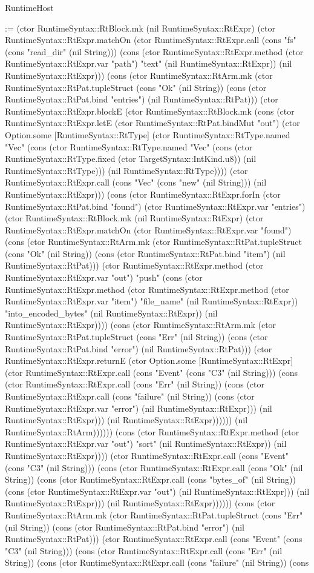 \begin{lexlean}{RuntimeHost}
\begin{semanticmodule}
{:= (ctor RuntimeSyntax::RtBlock.mk (nil RuntimeSyntax::RtExpr) (ctor RuntimeSyntax::RtExpr.matchOn (ctor RuntimeSyntax::RtExpr.call (cons "fs" (cons "read_dir" (nil String))) (cons (ctor RuntimeSyntax::RtExpr.method (ctor RuntimeSyntax::RtExpr.var "path") "text" (nil RuntimeSyntax::RtExpr)) (nil RuntimeSyntax::RtExpr))) (cons (ctor RuntimeSyntax::RtArm.mk (ctor RuntimeSyntax::RtPat.tupleStruct (cons "Ok" (nil String)) (cons (ctor RuntimeSyntax::RtPat.bind "entries") (nil RuntimeSyntax::RtPat))) (ctor RuntimeSyntax::RtExpr.blockE (ctor RuntimeSyntax::RtBlock.mk (cons (ctor RuntimeSyntax::RtExpr.letE (ctor RuntimeSyntax::RtPat.bindMut "out") (ctor Option.some [RuntimeSyntax::RtType] (ctor RuntimeSyntax::RtType.named "Vec" (cons (ctor RuntimeSyntax::RtType.named "Vec" (cons (ctor RuntimeSyntax::RtType.fixed (ctor TargetSyntax::IntKind.u8)) (nil RuntimeSyntax::RtType))) (nil RuntimeSyntax::RtType)))) (ctor RuntimeSyntax::RtExpr.call (cons "Vec" (cons "new" (nil String))) (nil RuntimeSyntax::RtExpr))) (cons (ctor RuntimeSyntax::RtExpr.forIn (ctor RuntimeSyntax::RtPat.bind "found") (ctor RuntimeSyntax::RtExpr.var "entries") (ctor RuntimeSyntax::RtBlock.mk (nil RuntimeSyntax::RtExpr) (ctor RuntimeSyntax::RtExpr.matchOn (ctor RuntimeSyntax::RtExpr.var "found") (cons (ctor RuntimeSyntax::RtArm.mk (ctor RuntimeSyntax::RtPat.tupleStruct (cons "Ok" (nil String)) (cons (ctor RuntimeSyntax::RtPat.bind "item") (nil RuntimeSyntax::RtPat))) (ctor RuntimeSyntax::RtExpr.method (ctor RuntimeSyntax::RtExpr.var "out") "push" (cons (ctor RuntimeSyntax::RtExpr.method (ctor RuntimeSyntax::RtExpr.method (ctor RuntimeSyntax::RtExpr.var "item") "file_name" (nil RuntimeSyntax::RtExpr)) "into_encoded_bytes" (nil RuntimeSyntax::RtExpr)) (nil RuntimeSyntax::RtExpr)))) (cons (ctor RuntimeSyntax::RtArm.mk (ctor RuntimeSyntax::RtPat.tupleStruct (cons "Err" (nil String)) (cons (ctor RuntimeSyntax::RtPat.bind "error") (nil RuntimeSyntax::RtPat))) (ctor RuntimeSyntax::RtExpr.returnE (ctor Option.some [RuntimeSyntax::RtExpr] (ctor RuntimeSyntax::RtExpr.call (cons "Event" (cons "C3" (nil String))) (cons (ctor RuntimeSyntax::RtExpr.call (cons "Err" (nil String)) (cons (ctor RuntimeSyntax::RtExpr.call (cons "failure" (nil String)) (cons (ctor RuntimeSyntax::RtExpr.var "error") (nil RuntimeSyntax::RtExpr))) (nil RuntimeSyntax::RtExpr))) (nil RuntimeSyntax::RtExpr)))))) (nil RuntimeSyntax::RtArm)))))) (cons (ctor RuntimeSyntax::RtExpr.method (ctor RuntimeSyntax::RtExpr.var "out") "sort" (nil RuntimeSyntax::RtExpr)) (nil RuntimeSyntax::RtExpr)))) (ctor RuntimeSyntax::RtExpr.call (cons "Event" (cons "C3" (nil String))) (cons (ctor RuntimeSyntax::RtExpr.call (cons "Ok" (nil String)) (cons (ctor RuntimeSyntax::RtExpr.call (cons "bytes_of" (nil String)) (cons (ctor RuntimeSyntax::RtExpr.var "out") (nil RuntimeSyntax::RtExpr))) (nil RuntimeSyntax::RtExpr))) (nil RuntimeSyntax::RtExpr)))))) (cons (ctor RuntimeSyntax::RtArm.mk (ctor RuntimeSyntax::RtPat.tupleStruct (cons "Err" (nil String)) (cons (ctor RuntimeSyntax::RtPat.bind "error") (nil RuntimeSyntax::RtPat))) (ctor RuntimeSyntax::RtExpr.call (cons "Event" (cons "C3" (nil String))) (cons (ctor RuntimeSyntax::RtExpr.call (cons "Err" (nil String)) (cons (ctor RuntimeSyntax::RtExpr.call (cons "failure" (nil String)) (cons }
\end{semanticmodule}
\end{lexlean}
